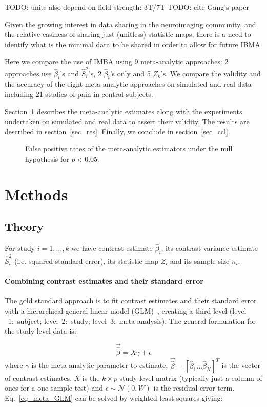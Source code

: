 \documentclass[preprint]{elsarticle}
\newcommand{\effectvector}{\hat\beta}
\newcommand{\effect}[1][i]{\effectvector_{#1}}
\newcommand{\vareffect}[1][i]{\hat S^2_{#1}}
\newcommand{\zeffect}[1][\studyidx]{Z_{#1}}
\newcommand{\nStudies}{K}
\newcommand{\studyidx}{k}
\newcommand{\metaanalyticeffect}{\gamma}
\newcommand{\transpose}{^T}
\begin{document}
TODO: units also depend on field strength: 3T/7T
TODO: cite Gang's paper

Given the growing interest in data sharing in the neuroimaging community, and the relative easiness of sharing just (unitless) statistic maps, there is a need to identify what is the minimal data to be shared in order to allow for future IBMA.

Here we compare the use of IMBA using 9 meta-analytic approaches: 2 approaches use $\effect$'s and $\vareffect$'s, 2 $\effect$'s only and 5 $\zeffect$'s. We compare the validity and the accuracy of the eight meta-analytic approaches on simulated and real data including 21 studies of pain in control subjects.

Section~\ref{sec_meth} describes the meta-analytic estimates along with the experiments undertaken on simulated and real data to assert their validity. The results are described in section~\ref{sec_res}. Finally, we conclude in section~\ref{sec_ccl}.

\begin{figure}[t]
	\centering
	\caption{False positive rates of the meta-analytic estimators under the null hypothesis for $p<0.05$.}
	\label{fig_fpr_all}
\end{figure}

\section{Methods}\label{sec_meth}
\subsection{Theory}
For study $i=1,\ldots,k$ we have contrast estimate $\effect$, its contrast variance estimate $\vareffect$ (i.e. squared standard error), its statistic map $Z_i$ and its sample size $n_i$.  

\paragraph{Combining contrast estimates and their standard error}

The gold standard approach is to fit contrast estimates and their standard error with a hierarchical general linear model (GLM)~\cite{Cummings2004}, creating a third-level (level ~1:~subject; level~2:~study; level~3:~meta-analysis). The general formulation for the study-level data is:

\begin{equation}
	\vec{\effectvector} = X \metaanalyticeffect + \epsilon
	\label{eq_meta_GLM}
\end{equation}
where $\metaanalyticeffect$ is the meta-analytic parameter to estimate, $\vec{\effectvector} = [\effect[1] \ldots \effect[\nStudies] ]\transpose$ is the vector of contrast estimates, $X$ is the $k\times p$ study-level matrix (typically just a column of ones for a one-sample test) and $\epsilon \sim \mathcal{N}(0,W)$ is the residual error term. Eq.~\eqref{eq_meta_GLM} can be solved by weighted least squares giving:
\end{document}
